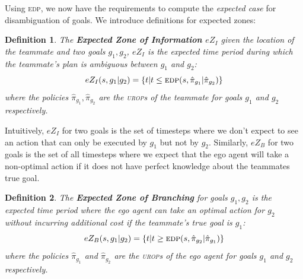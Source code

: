 \documentclass[letterpaper]{article}
\newtheorem{definition}{Definition}
\begin{document}
Using \textsc{edp}, we now have the requirements to compute the \emph{expected case} for disambiguation of goals. We introduce definitions for expected zones: %
\begin{definition}
The \textbf{Expected Zone of Information $eZ_I$} given the location of the teammate and two goals $g_1, g_2$, $eZ_I$ is the expected time period during which the teammate's plan is ambiguous between $g_1$ and $g_2$:
\begin{equation*}
    eZ_I(s, g_1 | g_2) = \{t| t \leq \textsc{edp}(s, \hat{\pi}_{g_1} | \hat{\pi}_{g_2})\}
\end{equation*}
where the policies $\hat{\pi}_{g_1},\hat{\pi}_{g_2}$ are the \textsc{urop}s of the teammate for goals $g_1$ and $g_2$ respectively.

\end{definition}

\noindent Intuitively, $eZ_I$ for two goals is the set of timesteps where we don't expect to see an action that can only be executed by $g_1$ but not by $g_2$. Similarly, $eZ_B$ for two goals is the set of all timesteps where we expect that the ego agent will take a non-optimal action if it does not have perfect knowledge about the teammates true goal.

\begin{definition}
The \textbf{Expected Zone of Branching} for goals $g_1, g_2$ is the expected time period where the ego agent can take an optimal action for $g_2$ without incurring additional cost if the teammate's true goal is $g_1$:
\begin{equation*}
    eZ_B(s, g_1 | g_2) = \{t | t \geq \textsc{edp}(s, \hat{\pi}_{g_2} | \hat{\pi}_{g_1})\}
\end{equation*}
where the policies $\hat{\pi}_{g_1}$ and $\hat{\pi}_{g_2}$ are the \textsc{urop}s of the \emph{ego agent} for goals $g_1$ and $g_2$ respectively.%
\end{definition}
\end{document}
